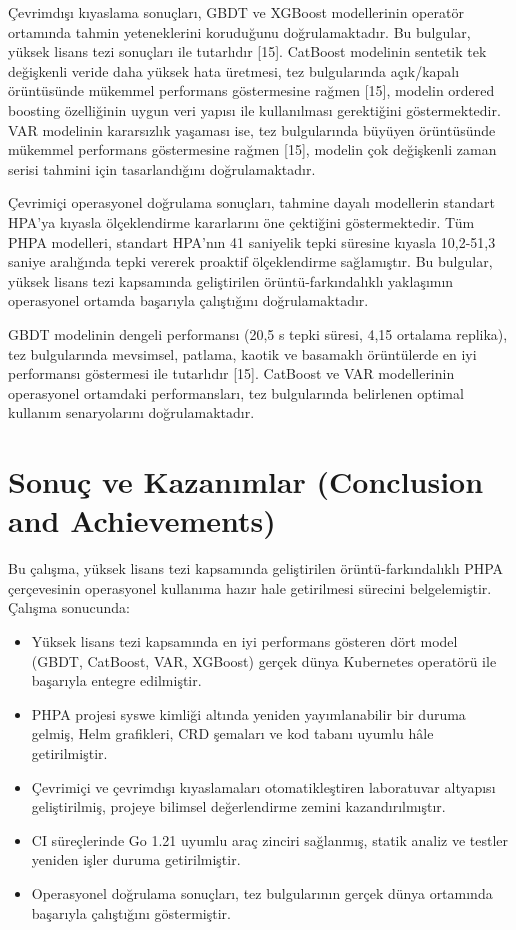 \documentclass[12pt,a4paper]{article}
\begin{document}
Çevrimdışı kıyaslama sonuçları, GBDT ve XGBoost modellerinin operatör ortamında tahmin yeteneklerini koruduğunu doğrulamaktadır. Bu bulgular, yüksek lisans tezi sonuçları ile tutarlıdır [15]. CatBoost modelinin sentetik tek değişkenli veride daha yüksek hata üretmesi, tez bulgularında açık/kapalı örüntüsünde mükemmel performans göstermesine rağmen [15], modelin ordered boosting özelliğinin uygun veri yapısı ile kullanılması gerektiğini göstermektedir. VAR modelinin kararsızlık yaşaması ise, tez bulgularında büyüyen örüntüsünde mükemmel performans göstermesine rağmen [15], modelin çok değişkenli zaman serisi tahmini için tasarlandığını doğrulamaktadır.

Çevrimiçi operasyonel doğrulama sonuçları, tahmine dayalı modellerin standart HPA'ya kıyasla ölçeklendirme kararlarını öne çektiğini göstermektedir. Tüm PHPA modelleri, standart HPA'nın 41 saniyelik tepki süresine kıyasla 10,2-51,3 saniye aralığında tepki vererek proaktif ölçeklendirme sağlamıştır. Bu bulgular, yüksek lisans tezi kapsamında geliştirilen örüntü-farkındalıklı yaklaşımın operasyonel ortamda başarıyla çalıştığını doğrulamaktadır.

GBDT modelinin dengeli performansı (20,5 s tepki süresi, 4,15 ortalama replika), tez bulgularında mevsimsel, patlama, kaotik ve basamaklı örüntülerde en iyi performansı göstermesi ile tutarlıdır [15]. CatBoost ve VAR modellerinin operasyonel ortamdaki performansları, tez bulgularında belirlenen optimal kullanım senaryolarını doğrulamaktadır.

\section{Sonuç ve Kazanımlar (Conclusion and Achievements)}

Bu çalışma, yüksek lisans tezi kapsamında geliştirilen örüntü-farkındalıklı PHPA çerçevesinin operasyonel kullanıma hazır hale getirilmesi sürecini belgelemiştir. Çalışma sonucunda:

\begin{itemize}[noitemsep]
  \item Yüksek lisans tezi kapsamında en iyi performans gösteren dört model (GBDT, CatBoost, VAR, XGBoost) gerçek dünya Kubernetes operatörü ile başarıyla entegre edilmiştir.
  \item PHPA projesi syswe kimliği altında yeniden yayımlanabilir bir duruma gelmiş, Helm grafikleri, CRD şemaları ve kod tabanı uyumlu hâle getirilmiştir.
  \item Çevrimiçi ve çevrimdışı kıyaslamaları otomatikleştiren laboratuvar altyapısı geliştirilmiş, projeye bilimsel değerlendirme zemini kazandırılmıştır.
  \item CI süreçlerinde Go 1.21 uyumlu araç zinciri sağlanmış, statik analiz ve testler yeniden işler duruma getirilmiştir.
  \item Operasyonel doğrulama sonuçları, tez bulgularının gerçek dünya ortamında başarıyla çalıştığını göstermiştir.
\end{itemize}
\end{document}
